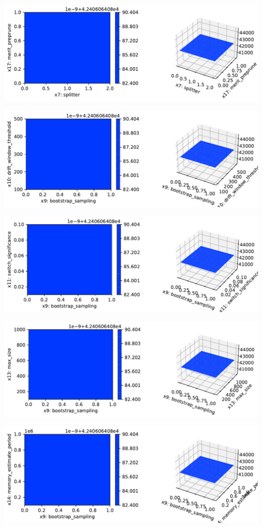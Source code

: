 \documentclass[
  letterpaper,
  DIV=11,
  numbers=noendperiod]{scrreprt}
\begin{document}
\includegraphics{024_spot_hpt_river_friedman_hatr_files/figure-pdf/cell-42-output-85.pdf}

\includegraphics{024_spot_hpt_river_friedman_hatr_files/figure-pdf/cell-42-output-86.pdf}

\includegraphics{024_spot_hpt_river_friedman_hatr_files/figure-pdf/cell-42-output-87.pdf}

\includegraphics{024_spot_hpt_river_friedman_hatr_files/figure-pdf/cell-42-output-88.pdf}

\includegraphics{024_spot_hpt_river_friedman_hatr_files/figure-pdf/cell-42-output-89.pdf}
\end{document}
